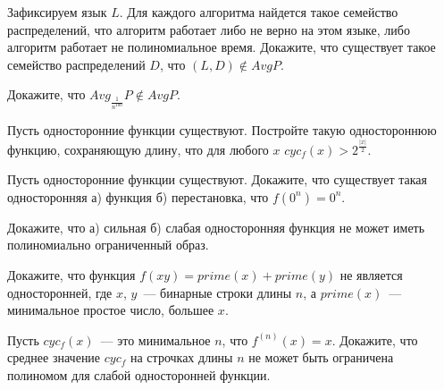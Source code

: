 \setcounter{curtask}{9}


\begin{task}
    Зафиксируем язык $L$. Для каждого алгоритма найдется такое семейство
    распределений, что алгоритм работает либо не верно на этом языке, либо алгоритм
    работает не полиномиальное время. Докажите, что существует такое семейство
    распределений $D$, что $(L, D) \notin AvgP$.
\end{task}

\begin{task}
    Докажите, что $Avg_{\frac{1}{n^{100}}}P \notin AvgP$.
\end{task}

\begin{task}
    Пусть односторонние функции существуют. Постройте такую одностороннюю функцию,
    сохраняющую длину, что для любого $x$ $cyc_{f}(x) > 2^{\frac{|x|}{2}}$.
\end{task}

\begin{task}
    Пусть односторонние функции существуют.
    Докажите, что существует такая односторонняя а) функция б) перестановка, что
    $f(0^n) = 0^n$.
\end{task}


\breakline

\begin{ptask}{3}
    Докажите, что а) сильная б) слабая односторонняя функция не может иметь
    полиномиально ограниченный образ.
\end{ptask}

\begin{ptask}{12}
    Докажите, что функция $f(xy) = prime(x) + prime(y)$ не является односторонней,
    где $x$, $y$~--- бинарные строки длины $n$, а $prime(x)$~--- минимальное простое
    число, большее $x$.
\end{ptask}

\begin{ptask}{13}
    Пусть $cyc_{f}(x)$~--- это минимальное $n$, что $f^{(n)}(x) = x$. Докажите, что
    среднее значение $cyc_{f}$ на строчках длины $n$ не может быть ограничена
    полиномом для слабой односторонней функции.
\end{ptask}

